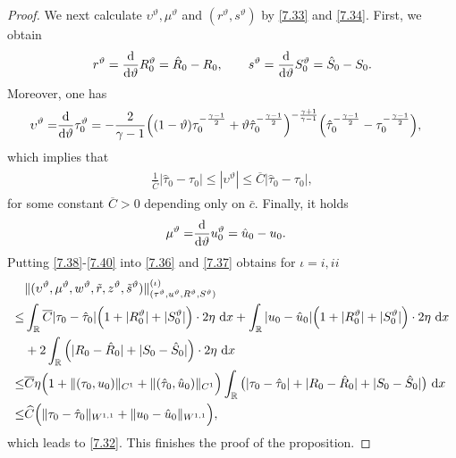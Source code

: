 \documentclass[11pt,reqno]{article}
\newcommand{\fr}{\frac}
\numberwithin{equation}{section}
\begin{document}
\begin{proof}
We next calculate $\upsilon^\vartheta, \mu^\vartheta$ and $(r^\vartheta, s^\vartheta)$ by \eqref{7.33} and \eqref{7.34}. First, we obtain
\begin{align}\label{7.38}
\begin{split}
r^\vartheta =\fr{{\rm d}}{{\rm d}\vartheta} R_{0}^\vartheta =\hat{R}_{0}-R_0, \qquad
s^\vartheta =\fr{{\rm d}}{{\rm d}\vartheta} S_{0}^\vartheta =\hat{S}_{0}-S_0.
\end{split}
\end{align}
Moreover, one has
\begin{align*}
\begin{split}
\upsilon^\vartheta =&\fr{{\rm d}}{{\rm d}\vartheta} \tau_{0}^\vartheta = -\fr{2}{\gamma-1}\Big((1-\vartheta)\tau_{0}^{-\fr{\gamma-1}{2}} +\vartheta\hat{\tau}_{0}^{-\fr{\gamma-1}{2}}  \Big)^{-\fr{\gamma+1}{\gamma-1}} \Big(\hat{\tau}_{0}^{-\fr{\gamma-1}{2}} -\tau_{0}^{-\fr{\gamma-1}{2}}\Big),
\end{split}
\end{align*}
which implies that
\begin{align}\label{7.39}
\begin{split}
\fr{1}{\overline{C}}|\hat{\tau}_{0}-\tau_0|\leq |\upsilon^\vartheta| \leq \overline{C}|\hat{\tau}_{0}-\tau_0|,
\end{split}
\end{align}
for some constant $\overline{C}>0$ depending only on $\bar{c}$. Finally, it holds
\begin{align}\label{7.40}
\begin{split}
\mu^\vartheta =&\fr{{\rm d}}{{\rm d}\vartheta} u_{0}^\vartheta = \hat{u}_{0}-u_0.
\end{split}
\end{align}
Putting \eqref{7.38}-\eqref{7.40} into \eqref{7.36} and \eqref{7.37} obtains for $\iota=i, ii$
\begin{align*}
\begin{split}
&\|(\upsilon^\vartheta, \mu^\vartheta, w^\vartheta, \tilde{r}, z^\vartheta, \tilde{s}^\vartheta)\|_{(\tau^\vartheta, u^\vartheta, R^\vartheta, S^\vartheta)}^{(\iota)}  \\ \leq &\int_{\mathbb{R}} \overline{C}|\tau_0-\hat{\tau}_0|\Big(1+|R_{0}^\vartheta| +|S_{0}^\vartheta|\Big)  \cdot 2\eta\ {\rm d}x  +\int_{\mathbb{R}} |u_0-\hat{u}_0|\Big(1+|R_{0}^\vartheta| +|S_{0}^\vartheta|\Big)  \cdot 2\eta\ {\rm d}x \\ &+2\int_{\mathbb{R}}\Big(|R_0-\hat{R}_{0}| +|S_0-\hat{S}_{0}|\Big)\cdot 2\eta\ {\rm d}x \\
\leq & \overline{C}\eta \Big(1+\|(\tau_0, u_0)\|_{C^1} +\|(\hat{\tau}_0, \hat{u}_0)\|_{C^1}\Big) \int_{\mathbb{R}}\big(|\tau_0-\hat{\tau}_0| +|R_0-\hat{R}_{0}| +|S_0-\hat{S}_{0}|\big)\ {\rm d}x \\
\leq &\widehat{C}\Big(\|\tau_0-\hat{\tau}_0\|_{W^{1,1}} +\|u_0-\hat{u}_0\|_{W^{1,1}}\Big),
\end{split}
\end{align*}
which leads to \eqref{7.32}. This finishes the proof of the proposition.
\end{proof}
\end{document}

